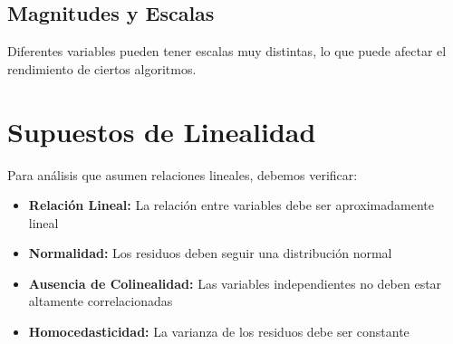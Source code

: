 \documentclass[12pt]{article}
\begin{document}
\subsection{Magnitudes y Escalas}
Diferentes variables pueden tener escalas muy distintas, lo que puede afectar el rendimiento de ciertos algoritmos.

\section{Supuestos de Linealidad}
Para análisis que asumen relaciones lineales, debemos verificar:

\begin{itemize}
    \item \textbf{Relación Lineal:} La relación entre variables debe ser aproximadamente lineal
    \item \textbf{Normalidad:} Los residuos deben seguir una distribución normal
    \item \textbf{Ausencia de Colinealidad:} Las variables independientes no deben estar altamente correlacionadas
    \item \textbf{Homocedasticidad:} La varianza de los residuos debe ser constante
\end{itemize}
\end{document}
